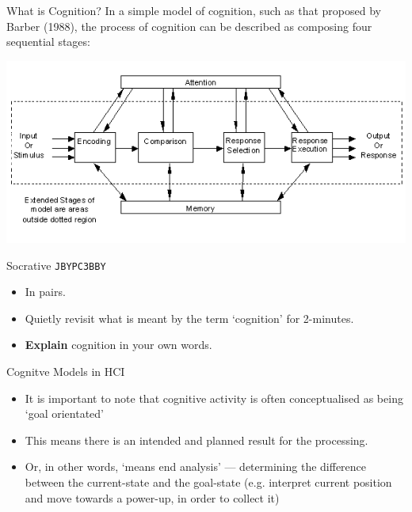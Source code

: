 \begin{frame}{What is Cognition?}
	In a simple model of cognition, such as that proposed by Barber (1988), the process of cognition can be described as composing four sequential
	stages: 
	
	\vspace{2ex}

	\includegraphics[height=24ex]{barber_cognition.png}
\end{frame}

\begin{frame}[fragile]{Socrative \texttt{JBYPC3BBY}}
	\begin{itemize}
		\item In pairs.
		\item Quietly revisit what is meant by the term `cognition' for 2-minutes.
		\item \textbf{Explain} cognition in your own words.
	\end{itemize}
\end{frame}

\begin{frame}{Cognitve Models in HCI}
	\begin{itemize}
		\item It is important to note that cognitive activity is often conceptualised as being `goal orientated'
		\item This means there is an intended and planned result for the processing.
		\item Or, in other words, `means end analysis' --- determining the difference between the current-state and the goal-state (e.g. interpret current position
		and move towards a power-up, in order to collect it)
	\end{itemize}
\end{frame}

